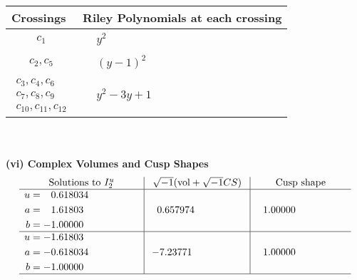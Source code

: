 \documentclass[1p]{elsarticle_modified}
\theoremstyle{definition}
\newcommand{\I}{\sqrt{-1}}
\begin{document}
\begin{tabular}{m{50pt}|m{274pt}}
Crossings & \hspace{64pt}Riley Polynomials at each crossing \\
\hline $$\begin{aligned}c_{1}\end{aligned}$$&$\begin{aligned}
&y^2
\end{aligned}$\\
\hline $$\begin{aligned}c_{2},c_{5}\end{aligned}$$&$\begin{aligned}
&(y-1)^2
\end{aligned}$\\
\hline $$\begin{aligned}c_{3},c_{4},c_{6}\\c_{7},c_{8},c_{9}\\c_{10},c_{11},c_{12}\end{aligned}$$&$\begin{aligned}
&y^2-3 y+1
\end{aligned}$\\
\hline
\end{tabular}\\~\\
\newpage\flushleft \textbf{(vi) Complex Volumes and Cusp Shapes}
$$\begin{array}{c|c|c}  
\text{Solutions to }I^u_{2}& \I (\text{vol} + \sqrt{-1}CS) & \text{Cusp shape}\\
 \hline 
\begin{aligned}
u &= \phantom{-}0.618034\phantom{ +0.000000I} \\
a &= \phantom{-}1.61803\phantom{ +0.000000I} \\
b &= -1.00000\phantom{ +0.000000I}\end{aligned}
 & \phantom{-}0.657974\phantom{ +0.000000I} & \phantom{-}1.00000\phantom{ +0.000000I} \\ \hline\begin{aligned}
u &= -1.61803\phantom{ +0.000000I} \\
a &= -0.618034\phantom{ +0.000000I} \\
b &= -1.00000\phantom{ +0.000000I}\end{aligned}
 & -7.23771\phantom{ +0.000000I} & \phantom{-}1.00000\phantom{ +0.000000I}\\
 \hline 
 \end{array}$$\newpage
\newpage\renewcommand{\arraystretch}{1}
\end{document}
